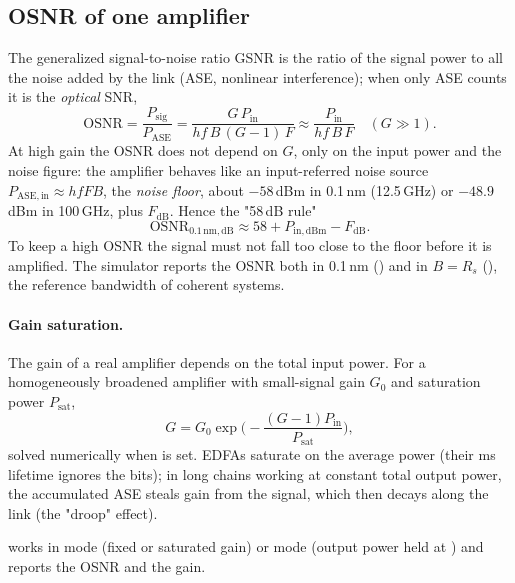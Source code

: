 \subsection{OSNR of one amplifier}
The generalized signal-to-noise ratio GSNR is the ratio of the signal power to all the noise
added by the link (ASE, nonlinear interference); when only ASE counts it is the \emph{optical} SNR,
\begin{equation}
  \mathrm{OSNR}=\frac{P_{\mathrm{sig}}}{P_{\mathrm{ASE}}}=\frac{G\,P_{\mathrm{in}}}{hf\,B\,(G-1)\,F}\approx\frac{P_{\mathrm{in}}}{hf\,B\,F}\quad(G\gg1).
\end{equation}
At high gain the OSNR does not depend on $G$, only on the input power and the noise figure: the
amplifier behaves like an input-referred noise source $P_{\mathrm{ASE,in}}\approx hfFB$, the \emph{noise floor}, about
$-58$\,dBm in 0.1\,nm (12.5\,GHz) or $-48.9$\,dBm in 100\,GHz, plus $F_{\mathrm{dB}}$. Hence the "58\,dB rule"
\begin{equation}
  \mathrm{OSNR}_{0.1\,\mathrm{nm,dB}}\approx58+P_{\mathrm{in,dBm}}-F_{\mathrm{dB}} .
  \label{eq:osnr58}
\end{equation}
To keep a high OSNR the signal must not fall too close to the floor before it is amplified. The
simulator reports the OSNR both in 0.1\,nm () and in $B=R_s$ (), the
reference bandwidth of coherent systems.

\paragraph{Gain saturation.} The gain of a real amplifier depends on the total input power. For a
homogeneously broadened amplifier with small-signal gain $G_0$ and saturation power $P_{\mathrm{sat}}$,
\begin{equation}
  G=G_0\exp\Big(-\frac{(G-1)P_{\mathrm{in}}}{P_{\mathrm{sat}}}\Big),
\end{equation}
solved numerically when  is set. EDFAs saturate on the average power
(their ms lifetime ignores the bits); in long chains working at constant total output power, the
accumulated ASE steals gain from the signal, which then decays along the link (the "droop" effect).

 works in  mode (fixed or saturated gain) or  mode (output
power held at ) and reports the OSNR and the gain.

